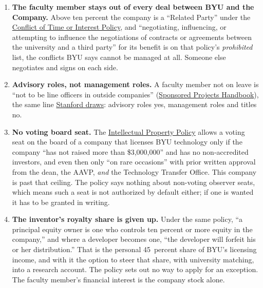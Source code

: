 \documentclass[11pt]{article}
\begin{document}
\begin{enumerate}[leftmargin=1.9em]
\item \textbf{The faculty member stays out of every deal between BYU and the
Company.} Above ten percent the company is a ``Related Party'' under the
\href{https://policy.byu.edu/view/conflict-of-time-or-interest-policy}{Conflict
of Time or Interest Policy}, and ``negotiating, influencing, or attempting to
influence the negotiations of contracts or agreements between the university
and a third party'' for its benefit is on that policy's \emph{prohibited}
list, the conflicts BYU says cannot be managed at all. Someone else negotiates
and signs on each side.
\item \textbf{Advisory roles, not management roles.} A faculty member not on
leave is ``not to be line officers in outside companies''
(\href{https://finserve.byu.edu/00000193-6566-d995-a9db-eff6a47a0001/sponsored-programs-handbook}{Sponsored
Projects Handbook}), the same line
\href{https://doresearch.stanford.edu/policies/research-policy-handbook/conflicts-commitment-and-interest/faculty-policy-conflict-commitment-and-interest}{Stanford
draws}: advisory roles yes, management roles and titles no.
\item \textbf{No voting board seat.} The
\href{https://policy.byu.edu/view/intellectual-property-policy}{Intellectual
Property Policy} allows a voting seat on the board of a company that licenses
BYU technology only if the company ``has not raised more than \$3,000,000''
and has no non-accredited investors, and even then only ``on rare occasions''
with prior written approval from the dean, the AAVP, \emph{and} the Technology
Transfer Office. This company is past that ceiling. The policy says nothing
about non-voting observer seats, which means such a seat is not authorized by
default either; if one is wanted it has to be granted in writing.
\item \textbf{The inventor's royalty share is given up.} Under the same
policy, ``a principal equity owner is one who controls ten percent or more
equity in the company,'' and where a developer becomes one, ``the developer
will forfeit his or her distribution.'' That is the personal 45~percent share
of BYU's licensing income, and with it the option to steer that share, with
university matching, into a research account. The policy sets out no way to
apply for an exception. The faculty member's financial interest is the company
stock alone.
\end{enumerate}
\end{document}
